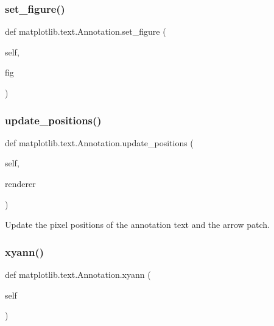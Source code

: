 \subsubsection{\texorpdfstring{set\+\_\+figure()}{set\_figure()}}
{\footnotesize\ttfamily def matplotlib.\+text.\+Annotation.\+set\+\_\+figure (\begin{DoxyParamCaption}\item[{}]{self,  }\item[{}]{fig }\end{DoxyParamCaption})}

\mbox{\label{classmatplotlib_1_1text_1_1Annotation_aecf40ec66fa4c79f7c95bf29e9551e75}} 
\subsubsection{\texorpdfstring{update\+\_\+positions()}{update\_positions()}}
{\footnotesize\ttfamily def matplotlib.\+text.\+Annotation.\+update\+\_\+positions (\begin{DoxyParamCaption}\item[{}]{self,  }\item[{}]{renderer }\end{DoxyParamCaption})}

\begin{DoxyVerb}Update the pixel positions of the annotation text and the arrow patch.
\end{DoxyVerb}
 \mbox{\label{classmatplotlib_1_1text_1_1Annotation_aea4a880dec3ce47cb412e84fec8b4360}} 
\subsubsection{\texorpdfstring{xyann()}{xyann()}\hspace{0.1cm}{\footnotesize\ttfamily [1/2]}}
{\footnotesize\ttfamily def matplotlib.\+text.\+Annotation.\+xyann (\begin{DoxyParamCaption}\item[{}]{self }\end{DoxyParamCaption})}

